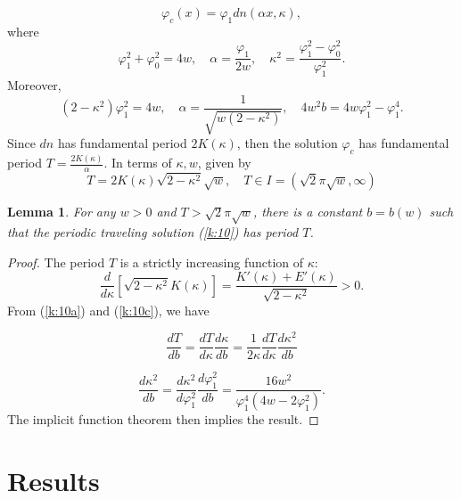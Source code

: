 \documentclass[final,11pt,leqno]{amsart}
\newtheorem{lemma}{Lemma}
\begin{document}
\begin{equation}
\label{k:10}
{\varphi}_c(x)={\varphi}_1 dn(\alpha x, \kappa),
\end{equation}
where
  \begin{equation}\label{k:10a}
     {\varphi}_1^2+{\varphi}_0^2=4w, \quad \alpha={\frac{{\varphi}_1}{2w}}, \quad \kappa^2={\frac{{\varphi}_1^2-{\varphi}_0^2}{{\varphi}_1^2}}.
   \end{equation}
   Moreover,
     \begin{equation}\label{k:10c}
       (2-\kappa^2){\varphi}_1^2=4w, \quad \alpha={\frac{1}{\sqrt{w(2-\kappa^2)}}}, \quad  4w^2b=4w{\varphi}_1^2-{\varphi}_1^4.
     \end{equation}
   Since $dn$ has fundamental period $2K(\kappa)$, then the solution ${\varphi}_c$ has fundamental period $T=\frac{2K(\kappa)}{\alpha}$. In terms of ${\kappa}, w$,  given by
     \begin{equation}\label{k:10b}
       T= 2K({\kappa}) \sqrt{2-{\kappa}^2} \sqrt{w} , \quad T\in I= ( \sqrt{2}\pi\sqrt{w}  , \infty)
     \end{equation}
\begin{lemma}\label{lk}
   For any $w>0$ and $T>\sqrt{2}\pi\sqrt{w}  $, there is a constant $b=b(w)$ such that the periodic traveling solution (\ref{k:10}) has period $T$.
 \end{lemma}
 \begin{proof}  The period $T$ is a strictly increasing function of $\kappa $:
   $$
   {\frac{d}{d\kappa}}[\sqrt{2-\kappa^2}K(\kappa)]={\frac{K'(\kappa)+E'(\kappa)}{\sqrt{2-\kappa^2}}}>0.
   $$
   From (\ref{k:10a}) and (\ref{k:10c}), we have

     $${\frac{dT}{db}}={\frac{dT}{d\kappa}}{\frac{d\kappa}{db}}={\frac{1}{2\kappa}}{\frac{dT}{d\kappa}}{\frac{d\kappa^2}{db}}$$

     $${\frac{d\kappa^2}{db}}={\frac{d\kappa^2}{d{\varphi}_1^2}}{\frac{d{\varphi}_1^2}{db}}={\frac{16w^2}{{\varphi}_1^4(4w-2{\varphi}_1^2)}}.$$
     The implicit function theorem then implies  the result.

   \end{proof}

\section{Results}
\label{sec:21}
\end{document}
